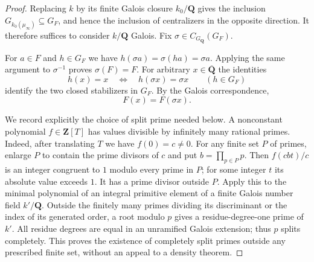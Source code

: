\begin{proof}
Replacing $k$ by its finite Galois closure $k_0/\mathbf Q$ gives the inclusion
$G_{k_0(\mu_\infty)}\subseteq G_F$, and hence the inclusion of centralizers
in the opposite direction. It therefore suffices to consider $k/\mathbf Q$
Galois. Fix $\sigma\in C_{G_{\mathbf Q}}(G_F)$.

For $a\in F$ and $h\in G_F$ we have
$h(\sigma a)=\sigma(ha)=\sigma a$. Applying the same argument to
$\sigma^{-1}$ proves $\sigma(F)=F$. For arbitrary
$x\in\overline{\mathbf Q}$ the identities
\[
 h(x)=x\quad\Longleftrightarrow\quad h(\sigma x)=\sigma x
 \qquad(h\in G_F)
\]
identify the two closed stabilizers in $G_F$. By the Galois correspondence,
\begin{equation}\label{eq:B-stabilizer}
 F(x)=F(\sigma x).
\end{equation}

We record explicitly the choice of split prime needed below. A nonconstant
polynomial $f\in\mathbf Z[T]$ has values divisible by infinitely many
rational primes. Indeed, after translating $T$ we have $f(0)=c\ne0$.
For any finite set $P$ of primes, enlarge $P$ to contain the prime divisors
of $c$ and put $b=\prod_{p\in P}p$. Then
$f(cbt)/c$ is an integer congruent to $1$ modulo every prime in $P$;
for some integer $t$ its absolute value exceeds $1$. It has a prime divisor
outside $P$. Apply this to the minimal polynomial of an integral primitive
element of a finite Galois number field $k'/\mathbf Q$. Outside the finitely
many primes dividing its discriminant or the index of its generated order,
a root modulo $p$ gives a residue-degree-one prime of $k'$. All residue
degrees are equal in an unramified Galois extension; thus $p$ splits
completely. This proves the existence of completely split primes outside
any prescribed finite set, without an appeal to a density theorem.


\end{proof}
